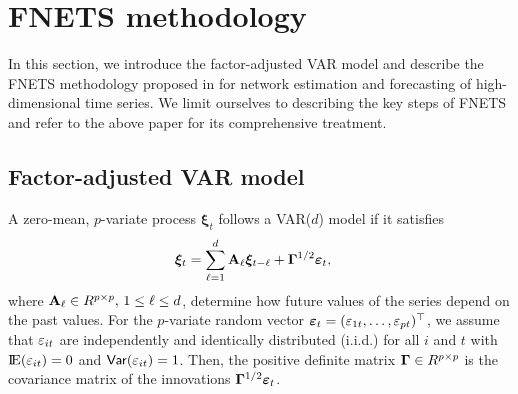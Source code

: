 \section{FNETS methodology}
\label{sec:models}

In this section, we introduce the factor-adjusted VAR model and describe the FNETS methodology proposed in \cite{barigozzi2022fnets} for network estimation and forecasting of high-dimensional time series.
We limit ourselves to describing the key steps of FNETS and refer to the above paper for its comprehensive treatment.

\subsection{Factor-adjusted VAR model}

A zero-mean, $p$-variate process $\bm\xi_t$ follows a VAR($d$) model if it satisfies
\begin{align}
\label{eq:idio:var}
    \bm\xi_t &= \sum_{\ell = 1}^{d} \mathbf A_{\ell} \bm\xi_{t - \ell} + \bm\Gamma^{1/2} \bm{\varepsilon}_t,
\end{align}
where $\mathbf A_\ell \in R^{p \times p}, \, 1 \le \ell \le d$, determine how future values of the series depend on the past values. 
For the $p$-variate random vector $\bm{\varepsilon}_t = (\varepsilon_{1t}, \ldots, \varepsilon_{pt})^\top$, we assume that $\varepsilon_{it}$ are independently and identically distributed (i.i.d.) for all $i$ and $t$ with $\E(\vep_{it}) = 0$ and $\mathsf{Var}(\varepsilon_{it}) = 1$. Then, the positive definite matrix $\bm\Gamma \in R^{p \times p}$ is the covariance matrix of the innovations $\bm\Gamma^{1/2} \bm{\varepsilon}_t$.
 
